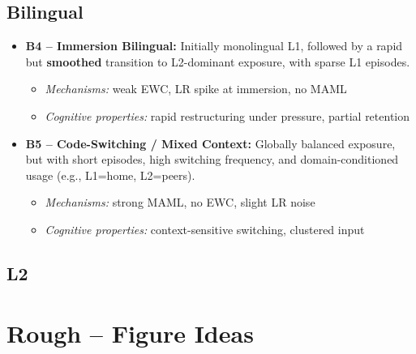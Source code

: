 \subsection{Bilingual}
\begin{itemize}
    \item \textbf{B4 – Immersion Bilingual:} Initially monolingual L1, followed by a rapid but \textbf{smoothed} transition to L2-dominant exposure, with sparse L1 episodes.
    \begin{itemize}
        \item \textit{Mechanisms:} weak EWC, LR spike at immersion, no MAML
        \item \textit{Cognitive properties:} rapid restructuring under pressure, partial retention
    \end{itemize}

    \item \textbf{B5 – Code-Switching / Mixed Context:} Globally balanced exposure, but with short episodes, high switching frequency, and domain-conditioned usage (e.g., L1=home, L2=peers).
    \begin{itemize}
        \item \textit{Mechanisms:} strong MAML, no EWC, slight LR noise
        \item \textit{Cognitive properties:} context-sensitive switching, clustered input
    \end{itemize}
\end{itemize} 

\subsection{L2}



\section{Rough – Figure Ideas}





